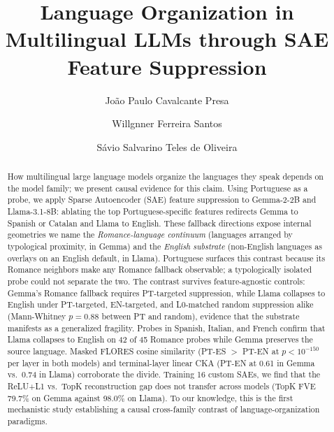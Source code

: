 \documentclass[runningheads]{llncs}
\begin{document}
\title{Language Organization in Multilingual LLMs through SAE Feature Suppression}


\author{João Paulo Cavalcante Presa \and
Willgnner Ferreira Santos \and
Sávio Salvarino Teles de Oliveira}

\maketitle

\begin{abstract}
How multilingual large language models organize the languages they speak depends on the model family; we present causal evidence for this claim. Using Portuguese as a probe, we apply Sparse Autoencoder (SAE) feature suppression to Gemma-2-2B and Llama-3.1-8B: ablating the top Portuguese-specific features redirects Gemma to Spanish or Catalan and Llama to English. These fallback directions expose internal geometries we name the \emph{Romance-language continuum} (languages arranged by typological proximity, in Gemma) and the \emph{English substrate} (non-English languages as overlays on an English default, in Llama). Portuguese surfaces this contrast because its Romance neighbors make any Romance fallback observable; a typologically isolated probe could not separate the two. The contrast survives feature-agnostic controls: Gemma's Romance fallback requires PT-targeted suppression, while Llama collapses to English under PT-targeted, EN-targeted, and L0-matched random suppression alike (Mann-Whitney $p = 0.88$ between PT and random), evidence that the substrate manifests as a generalized fragility. Probes in Spanish, Italian, and French confirm that Llama collapses to English on 42 of 45 Romance probes while Gemma preserves the source language. Masked FLORES cosine similarity (PT-ES $>$ PT-EN at $p < 10^{-150}$ per layer in both models) and terminal-layer linear CKA (PT-EN at 0.61 in Gemma vs.\ 0.74 in Llama) corroborate the divide. Training 16 custom SAEs, we find that the ReLU+L1 vs.\ TopK reconstruction gap does not transfer across models (TopK FVE 79.7\% on Gemma against 98.0\% on Llama). To our knowledge, this is the first mechanistic study establishing a causal cross-family contrast of language-organization paradigms.

\end{abstract}
\end{document}
